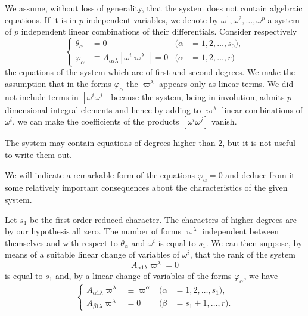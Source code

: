 \documentclass[leqno,11pt]{book}
\numberwithin{equation}{chapter}
\theoremstyle{shape1}
\theoremstyle{shape0}
\theoremstyle{shape2}
\theoremstyle{definition}
\begin{document}
\fsec We assume, without loss of generality, that the system does not contain algebraic equations. If it is in $p$ independent variables, we denote by $\omega^{1},\omega^{2},\dots,\omega^{p}$ a system of $p$ independent linear combinations of their differentials. Consider respectively
\begin{equation}
  \label{eq:5.8}
  \left\{
    \begin{aligned}
      \theta_{\alpha}&=0&(\alpha&=1,2,\dots,s_{0}),\\
      \varphi_{\alpha}&\equiv A_{\alpha i\lambda}[\omega^{i}\varpi^{\lambda}]=0&(\alpha&=1,2,\dots,r)
    \end{aligned}
  \right.
\end{equation}
the equations of the system which are of first and second degrees. We make the assumption that in the forms $\varphi_{\alpha}$ the $\varpi^{\lambda}$ appears only as linear terms. We did not include terms in $[\omega^{i}\omega^{j}]$ because the system, being in involution, admits $p$ dimensional integral elements and hence by adding to $\varpi^{\lambda}$ linear combinations of $\omega^{i}$, we can make the coefficients of the products $[\omega^{i}\omega^{j}]$ vanish.

The system may contain equations of degrees higher than $2$, but it is not useful to write them out.

We will indicate a remarkable form of the equations $\varphi_{\alpha}=0$ and deduce from it some relatively important consequences about the characteristics of the given system.

\vspace{12pt}\fsec Let $s_{1}$ be the first order reduced character. The characters of higher degrees are by our hypothesis all zero. The number of  forms $\varpi^{\lambda}$ independent between themselves and with respect to $\theta_{\alpha}$ and $\omega^{i}$ is equal to $s_{1}$. We can then suppose, by means of a suitable linear change of variables of $\omega^{i}$, that the rank of the system
\[
A_{\alpha1\lambda}\varpi^{\lambda}=0
\]
is equal to $s_{1}$ and, by a linear change of variables of the forms $\varphi_{\alpha}$, we have
\begin{equation}
  \label{eq:5.9}
  \left\{
    \begin{aligned}
      A_{\alpha 1 \lambda}\varpi^{\lambda}&\equiv \varpi^{\alpha}&(\alpha&=1,2,\dots,s_{1}),\\
      A_{\beta 1\lambda}\varpi^{\lambda}&=0&(\beta&=s_{1}+1,\dots,r).
    \end{aligned}
  \right.
\end{equation}
\end{document}
